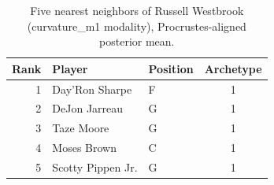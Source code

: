 \begin{table}[htbp]
  \centering\small
  \begin{tabular}{rllc}
    \toprule
    Rank & Player & Position & Archetype \\
    \midrule
    1 & Day'Ron Sharpe & F & 1 \\
    2 & DeJon Jarreau & G & 1 \\
    3 & Taze Moore & G & 1 \\
    4 & Moses Brown & C & 1 \\
    5 & Scotty Pippen Jr. & G & 1 \\
    \bottomrule
  \end{tabular}
  \caption{Five nearest neighbors of Russell Westbrook (curvature_m1 modality), Procrustes-aligned posterior mean.}
  \label{tab:Russell_Westbrook_neighbors_curvature_m1}
\end{table}

